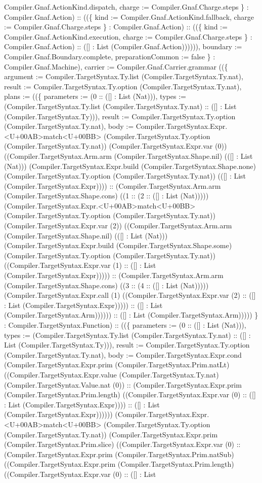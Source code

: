 \documentclass[11pt]{article}
\begin{document}
Compiler.Gnaf.ActionKind.dispatch, charge := Compiler.Gnaf.Charge.steps \} : Compiler.Gnaf.Action) :: ((\{ kind := Compiler.Gnaf.ActionKind.fallback, charge := Compiler.Gnaf.Charge.steps \} : Compiler.Gnaf.Action) :: ((\{ kind := Compiler.Gnaf.ActionKind.execution, charge := Compiler.Gnaf.Charge.steps \} : Compiler.Gnaf.Action) :: ([] : List (Compiler.Gnaf.Action)))))), boundary := Compiler.Gnaf.Boundary.complete, preparationCommon := false \} : Compiler.Gnaf.Machine), carrier := Compiler.Gnaf.Carrier.grammar ((\{ argument := Compiler.TargetSyntax.Ty.list (Compiler.TargetSyntax.Ty.nat), result := Compiler.TargetSyntax.Ty.option (Compiler.TargetSyntax.Ty.nat), plans := ((\{ parameters := (0 :: ([] : List (Nat))), types := (Compiler.TargetSyntax.Ty.list (Compiler.TargetSyntax.Ty.nat) :: ([] : List (Compiler.TargetSyntax.Ty))), result := Compiler.TargetSyntax.Ty.option (Compiler.TargetSyntax.Ty.nat), body := Compiler.TargetSyntax.Expr.<U+00AB>match<U+00BB> (Compiler.TargetSyntax.Ty.option (Compiler.TargetSyntax.Ty.nat)) (Compiler.TargetSyntax.Expr.var (0)) ((Compiler.TargetSyntax.Arm.arm (Compiler.TargetSyntax.Shape.nil) (([] : List (Nat))) (Compiler.TargetSyntax.Expr.build (Compiler.TargetSyntax.Shape.none) (Compiler.TargetSyntax.Ty.option (Compiler.TargetSyntax.Ty.nat)) (([] : List (Compiler.TargetSyntax.Expr)))) :: (Compiler.TargetSyntax.Arm.arm (Compiler.TargetSyntax.Shape.cons) ((1 :: (2 :: ([] : List (Nat))))) (Compiler.TargetSyntax.Expr.<U+00AB>match<U+00BB> (Compiler.TargetSyntax.Ty.option (Compiler.TargetSyntax.Ty.nat)) (Compiler.TargetSyntax.Expr.var (2)) ((Compiler.TargetSyntax.Arm.arm (Compiler.TargetSyntax.Shape.nil) (([] : List (Nat))) (Compiler.TargetSyntax.Expr.build (Compiler.TargetSyntax.Shape.some) (Compiler.TargetSyntax.Ty.option (Compiler.TargetSyntax.Ty.nat)) ((Compiler.TargetSyntax.Expr.var (1) :: ([] : List (Compiler.TargetSyntax.Expr))))) :: (Compiler.TargetSyntax.Arm.arm (Compiler.TargetSyntax.Shape.cons) ((3 :: (4 :: ([] : List (Nat))))) (Compiler.TargetSyntax.Expr.call (1) ((Compiler.TargetSyntax.Expr.var (2) :: ([] : List (Compiler.TargetSyntax.Expr))))) :: ([] : List (Compiler.TargetSyntax.Arm)))))) :: ([] : List (Compiler.TargetSyntax.Arm))))) \} : Compiler.TargetSyntax.Function) :: ((\{ parameters := (0 :: ([] : List (Nat))), types := (Compiler.TargetSyntax.Ty.list (Compiler.TargetSyntax.Ty.nat) :: ([] : List (Compiler.TargetSyntax.Ty))), result := Compiler.TargetSyntax.Ty.option (Compiler.TargetSyntax.Ty.nat), body := Compiler.TargetSyntax.Expr.cond (Compiler.TargetSyntax.Expr.prim (Compiler.TargetSyntax.Prim.natLt) ((Compiler.TargetSyntax.Expr.value (Compiler.TargetSyntax.Ty.nat) (Compiler.TargetSyntax.Value.nat (0)) :: (Compiler.TargetSyntax.Expr.prim (Compiler.TargetSyntax.Prim.length) ((Compiler.TargetSyntax.Expr.var (0) :: ([] : List (Compiler.TargetSyntax.Expr)))) :: ([] : List (Compiler.TargetSyntax.Expr)))))) (Compiler.TargetSyntax.Expr.<U+00AB>match<U+00BB> (Compiler.TargetSyntax.Ty.option (Compiler.TargetSyntax.Ty.nat)) (Compiler.TargetSyntax.Expr.prim (Compiler.TargetSyntax.Prim.slice) ((Compiler.TargetSyntax.Expr.var (0) :: (Compiler.TargetSyntax.Expr.prim (Compiler.TargetSyntax.Prim.natSub) ((Compiler.TargetSyntax.Expr.prim (Compiler.TargetSyntax.Prim.length) ((Compiler.TargetSyntax.Expr.var (0) :: ([] : List 
\end{document}
